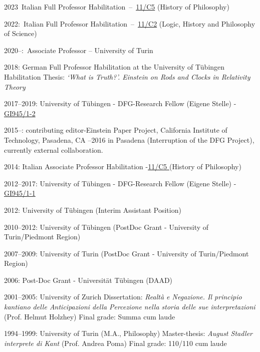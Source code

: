 \documentclass{article}
\renewenvironment{itemize}{
  \begin{list}{}{
    \setlength{\leftmargin}{1.5em}
  }
}{
  \end{list}
}
\begin{document}
\begin{itemize}
\item 2023~Italian Full Professor Habilitation~--~\href{https://asn21.cineca.it/pubblico/miur/esito-abilitato/11\%252FC5/1/6}{11/C5} (History of Philosophy) 
\item 2022:~Italian Full Professor Habilitation~--~\href{https://asn21.cineca.it/pubblico/miur/esito-abilitato/11\%252FC2/1/3}{11/C2} (Logic, History and Philosophy of Science) 
\item 2020--:~Associate Professor -- University of Turin
\item 2018: German Full Professor Habilitation at the University of T\"ubingen
\subitem Habilitation Thesis: \emph{`What is Truth?'. Einstein on Rods and Clocks in Relativity Theory}
\item 2017--2019: University of T\"ubingen - DFG-Research Fellow (Eigene Stelle) - \href{http://gepris.dfg.de/gepris/projekt/218862409}{GI945/1-2}
\item 2015--: contributing editor-Einstein Paper Project, California Institute of Technology, Pasadena, CA
--2016 in Pasadena (Interruption of the DFG Project), currently external collaboration.
\item 2014: Italian Associate Professor Habilitation -\href{https://abilitazione.cineca.it/ministero.php/public/esitoAbilitati/settore/11\%252FC5/fascia/2}{11/C5 } (History of Philosophy)
\item 2012--2017: University of T\"ubingen - DFG-Research Fellow (Eigene Stelle) - \href{http://gepris.dfg.de/gepris/projekt/218862409}{GI945/1-1}
\item 2012: University of T\"ubingen (Interim Assistant Position)
\item 2010--2012: University of T\"ubingen (PostDoc Grant - University of Turin/Piedmont Region)
\item 2007--2009: University of Turin (PostDoc Grant - University of Turin/Piedmont Region)
\item 2006: Post-Doc Grant - Universit\"{a}t T\"ubingen (DAAD)
\item 2001--2005: University of Zurich \subitem Dissertation: \emph{Realt\`a e Negazione. Il principio kantiano delle Anticipazioni della Percezione nella storia delle sue interpretazioni} (Prof. Helmut Holzhey) \subitem Final grade: Summa cum laude
\item 1994--1999: University of Turin (M.A., Philosophy) \subitem Master-thesis: \emph{August Stadler interprete di Kant} (Prof. Andrea Poma) \subitem Final grade: 110/110 cum laude

 \end{itemize}
\end{document}
